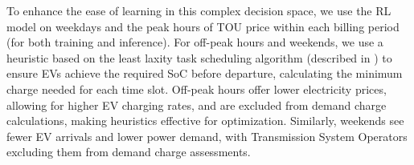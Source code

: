 To enhance the ease of learning in this complex decision space, we use the RL model on weekdays and the peak hours of TOU price within each billing period (for both training and inference). For off-peak hours and weekends, we use a heuristic based on the least laxity task scheduling algorithm (described in ) to ensure EVs achieve the required SoC before departure, calculating the minimum charge needed for each time slot. Off-peak hours offer lower electricity prices, allowing for higher EV charging rates, and are excluded from demand charge calculations, making heuristics effective for optimization. Similarly, weekends see fewer EV arrivals and lower power demand, with Transmission System Operators excluding them from demand charge assessments. 
